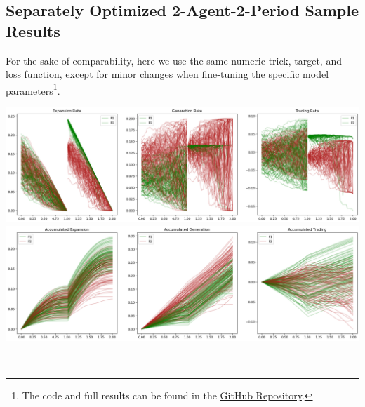 \documentclass[a4paper,10pt]{article}
\newcommand{\1}{\mathbf{1}}
\begin{document}
\newpage  %

\subsection{Separately Optimized 2-Agent-2-Period Sample Results}

For the sake of comparability, here we use the same numeric trick, target, and loss function, except for minor changes when fine-tuning the specific model parameters\footnote{The code and full results can be found in the \href{https://github.com/OrangeAoo/PA-MFG-FBSDE/blob/FBSDE/2Period/Separate_Optim_1Prdx2/Adamax_clamp_sig_MSE.ipynb}{GitHub Repository}.}.

\begin{minipage}{\textwidth}
  \centering
  \begin{minipage}[ht]{0.8\textwidth}
    \centering
    \includegraphics[]{FinalReports/Illustration_diagrams/Seprt-2A2P-Sigmoid-ResExamples/Rates.png}\\
    \includegraphics[]{FinalReports/Illustration_diagrams/Seprt-2A2P-Sigmoid-ResExamples/AccumRates.png}\\
    \label{fig:decomp-gen-sep}
  \end{minipage}\\
  \vspace{20pt}
  \begin{minipage}[ht]{0.65\textwidth}
    \centering

\end{minipage}
\end{minipage}
\end{document}
